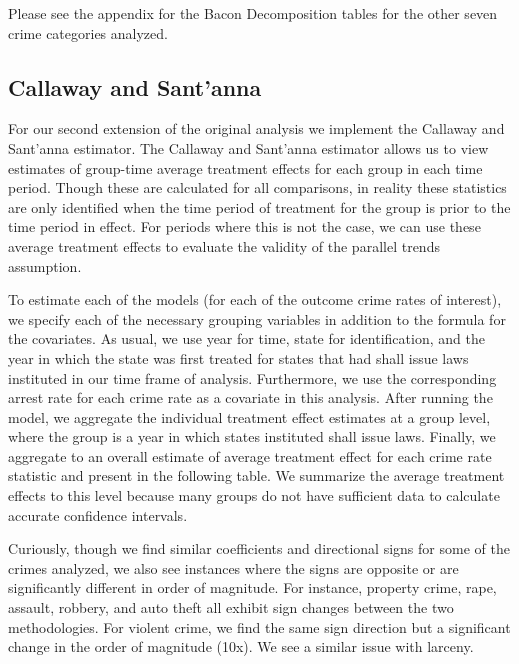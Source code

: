 \documentclass{article}
\begin{document}




Please see the appendix for the Bacon Decomposition tables for the other seven crime categories analyzed.

\subsection{Callaway and Sant'anna}

For our second extension of the original analysis we implement the Callaway and Sant'anna estimator. The Callaway and Sant'anna estimator allows us to view estimates of group-time average treatment effects for each group in each time period. Though these are calculated for all comparisons, in reality these statistics are only identified when the time period of treatment for the group is prior to the time period in effect. For periods where this is not the case, we can use these average treatment effects to evaluate the validity of the parallel trends assumption. 

To estimate each of the models (for each of the outcome crime rates of interest), we specify each of the necessary grouping variables in addition to the formula for the covariates. As usual, we use year for time, state for identification, and the year in which the state was first treated for states that had shall issue laws instituted in our time frame of analysis. Furthermore, we use the corresponding arrest rate for each crime rate as a covariate in this analysis. After running the model, we aggregate the individual treatment effect estimates at a group level, where the group is a year in which states instituted shall issue laws. Finally, we aggregate to an overall estimate of average treatment effect for each crime rate statistic and present in the following table. We summarize the average treatment effects to this level because many groups do not have sufficient data to calculate accurate confidence intervals.



Curiously, though we find similar coefficients and directional signs for some of the crimes analyzed, we also see instances where the signs are opposite or are significantly different in order of magnitude. For instance, property crime, rape, assault, robbery, and auto theft all exhibit sign changes between the two methodologies. For violent crime, we find the same sign direction but a significant change in the order of magnitude (10x). We see a similar issue with larceny.
\end{document}
